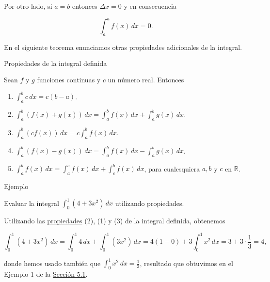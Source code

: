 \documentclass[
  letterpaper,
]{book}
\theoremstyle{plain}
\theoremstyle{remark}
\begin{document}
Por otro lado, si \(a=b\) entonces \(\Delta x=0\) y en consecuencia

\[
\int_a^a f(x)\,dx=0.
\]

En el siguiente teorema enunciamos otras propiedades adicionales de la
integral.

\label{teo-propiedades-integraldef}
Propiedades de la integral definida

Sean \(f\) y \(g\) funciones continuas y \(c\) un número real. Entonces

\begin{enumerate}
\def\labelenumi{\arabic{enumi}.}
\item
  \(\displaystyle \int_a^b c\,dx =c(b-a)\).
\item
  \(\displaystyle \int_a^b (f(x)+g(x))\,dx =\int_a^b f(x)\,dx+\int_a^b g(x)\,dx\).
\item
  \(\displaystyle \int_a^b (cf(x))\,dx=c\int_a^b f(x)\,dx\).
\item
  \(\displaystyle \int_a^b (f(x)-g(x))\,dx =\int_a^b f(x)\,dx-\int_a^b g(x)\,dx\).
\item
  \(\displaystyle \int_a^b f(x)\,dx  =\int_a^c f(x)\,dx+\int_c^b f(x)\,dx\),
  para cualesquiera \(a,b\) y \(c\) en \(\mathbb{R}\).
\end{enumerate}

Ejemplo

Evaluar la integral \(\displaystyle \int_0^1 (4+3x^2)\,dx\) utilizando
propiedades.

\begin{tcolorbox}[enhanced jigsaw, opacityback=0, left=2mm, opacitybacktitle=0.6, toprule=.15mm, bottomrule=.15mm, colbacktitle=quarto-callout-tip-color!10!white, titlerule=0mm, bottomtitle=1mm, title=\textcolor{quarto-callout-tip-color}{\faLightbulb}\hspace{0.5em}{Solución}, toptitle=1mm, colframe=quarto-callout-tip-color-frame, colback=white, breakable, rightrule=.15mm, arc=.35mm, leftrule=.75mm, coltitle=black]

Utilizando las \hyperref[teo-propiedades-integraldef]{propiedades} (2),
(1) y (3) de la integral definida, obtenemos

\[
\int_0^1 (4+3x^2)\,dx = \int_0^1 4\,dx+\int_0^1 (3x^2)\,dx=4(1-0)+3\int_0^1 x^2\,dx=3+3\cdot \frac{1}{3}=4, 
\]

donde hemos usado también que
\(\displaystyle \int_0^1 x^2\,dx=\frac{1}{3}\), resultado que obtuvimos
en el Ejemplo 1 de la \hyperref[seccion_5.1]{Sección 5.1}.

\end{tcolorbox}
\end{document}
